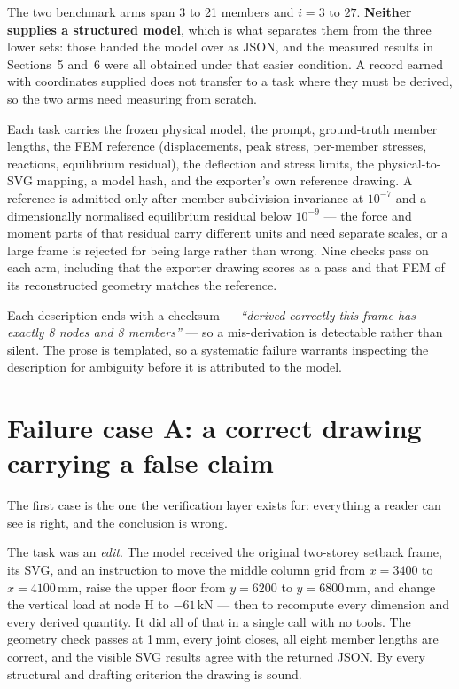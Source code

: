 \documentclass[11pt,a4paper]{article}
\begin{document}
The two benchmark arms span 3 to 21 members and $i = 3$ to $27$. \textbf{Neither supplies a structured
model}, which is what separates them from the three lower sets: those handed the model over as JSON, and
the measured results in Sections~5 and~6 were all obtained under that easier condition. A record earned
with coordinates supplied does not transfer to a task where they must be derived, so the two arms need
measuring from scratch.

Each task carries the frozen physical model, the prompt, ground-truth member lengths, the FEM reference
(displacements, peak stress, per-member stresses, reactions, equilibrium residual), the deflection and
stress limits, the physical-to-SVG mapping, a model hash, and the exporter's own reference drawing. A
reference is admitted only after member-subdivision invariance at $10^{-7}$ and a dimensionally
normalised equilibrium residual below $10^{-9}$ --- the force and moment parts of that residual carry
different units and need separate scales, or a large frame is rejected for being large rather than wrong.
Nine checks pass on each arm, including that the exporter drawing scores as a pass and that FEM of its
reconstructed geometry matches the reference.

Each description ends with a checksum --- \emph{``derived correctly this frame has exactly 8 nodes and 8
members''} --- so a mis-derivation is detectable rather than silent. The prose is templated, so a
systematic failure warrants inspecting the description for ambiguity before it is attributed to the model.

\section{Failure case A: a correct drawing carrying a false claim}

The first case is the one the verification layer exists for: everything a reader can see is right, and
the conclusion is wrong.

The task was an \emph{edit}. The model received the original two-storey setback frame, its SVG, and an
instruction to move the middle column grid from $x=3400$ to $x=4100$\,mm, raise the upper floor from
$y=6200$ to $y=6800$\,mm, and change the vertical load at node H to $-61$\,kN --- then to recompute
every dimension and every derived quantity. It did all of that in a single call with no tools. The
geometry check passes at 1\,mm, every joint closes, all eight member lengths are correct, and the
visible SVG results agree with the returned JSON. By every structural and drafting criterion the
drawing is sound.
\end{document}
